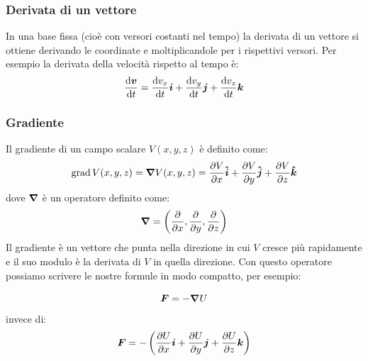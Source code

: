 \subsubsection{Derivata di un vettore}
In una base fissa (cioè con versori costanti nel tempo) la derivata di un vettore si ottiene derivando le coordinate e moltiplicandole per i rispettivi versori. Per esempio la derivata della velocità rispetto al tempo è:
\[\frac{\mathrm{d}\boldsymbol{v}}{\mathrm{d} t}=\frac{\mathrm{d} v_x}{\mathrm{d} t}\boldsymbol{i}+\frac{\mathrm{d} v_y}{\mathrm{d} t}\boldsymbol{j}+\frac{\mathrm{d} v_z}{\mathrm{d} t}\boldsymbol{k}\]

\subsubsection{Gradiente}
\label{gradiente}
Il gradiente di un campo scalare $V(x,y,z)$ è definito come:
\[
  \operatorname{grad} V(x,y,z)=\boldsymbol{\nabla} V(x,y,z)=\frac{\partial V}{\partial x}\boldsymbol{\hat {i}} + \frac{\partial V}{\partial y}\boldsymbol{\hat {j}} +\frac{\partial V}{\partial z}\boldsymbol{\hat {k}}
\]
dove $\boldsymbol{\nabla}$ è un operatore definito come:
\[
  \boldsymbol{\nabla}=\left(\frac{\partial}{\partial x},\frac{\partial}{\partial y},\frac{\partial }{\partial z}\right)
\]
Il gradiente è un vettore che punta nella direzione in cui $V$ cresce più rapidamente e il suo modulo è la derivata di $V$ in quella direzione. Con questo operatore possiamo scrivere le nostre formule in modo compatto, per esempio:

\[
  \boldsymbol{F}=-\boldsymbol{\nabla} U
\]
invece di:
\[
  \boldsymbol{F}=-\left(\frac{\partial U}{\partial
    x}\boldsymbol{i}+\frac{\partial U}{\partial y}\boldsymbol{j}+\frac{\partial
    U}{\partial z}\boldsymbol{k}\right)
\]
